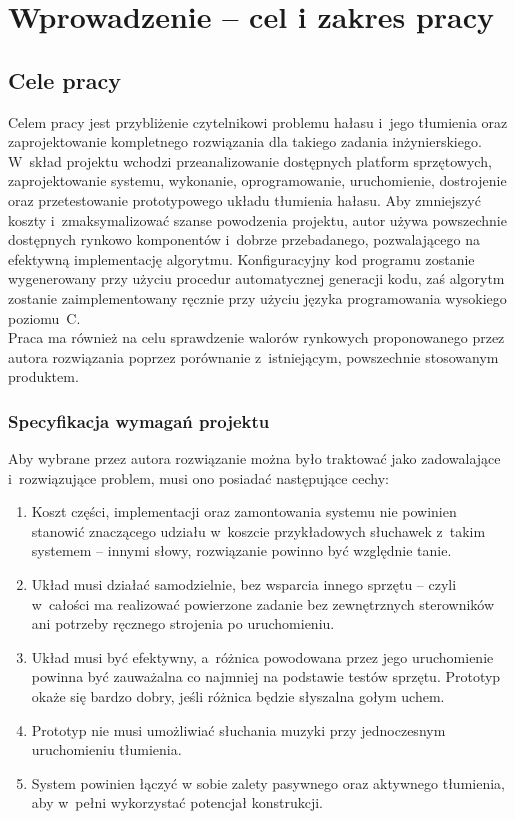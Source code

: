 \chapter{Wprowadzenie -- cel i zakres pracy}
\label{cha:intro}

\section{Cele pracy}
\label{sec:celePracy}
Celem pracy jest przybliżenie czytelnikowi problemu hałasu i~jego tłumienia oraz  zaprojektowanie kompletnego rozwiązania dla takiego zadania inżynierskiego. W~skład projektu wchodzi przeanalizowanie dostępnych platform sprzętowych, zaprojektowanie systemu, wykonanie, oprogramowanie, uruchomienie, dostrojenie oraz przetestowanie prototypowego układu tłumienia hałasu. Aby zmniejszyć koszty i~zmaksymalizować szanse powodzenia projektu, autor używa powszechnie dostępnych rynkowo komponentów i~dobrze przebadanego, pozwalającego na efektywną implementację algorytmu. Konfiguracyjny kod programu zostanie wygenerowany przy użyciu procedur automatycznej generacji kodu, zaś algorytm zostanie zaimplementowany ręcznie przy użyciu języka programowania wysokiego poziomu~C.\\
Praca ma również na celu sprawdzenie walorów rynkowych proponowanego przez autora rozwiązania poprzez porównanie z~istniejącym, powszechnie stosowanym produktem.
\subsection{Specyfikacja wymagań projektu}
Aby wybrane przez autora rozwiązanie można było traktować jako zadowalające i~rozwiązujące problem, musi ono posiadać następujące cechy:
\begin{enumerate}
	\item Koszt części, implementacji oraz zamontowania systemu nie powinien stanowić znaczącego udziału w~koszcie przykładowych słuchawek z~takim systemem -- innymi słowy, rozwiązanie powinno być względnie tanie.
	\item Układ musi działać samodzielnie, bez wsparcia innego sprzętu -- czyli w~całości ma realizować powierzone zadanie bez zewnętrznych sterowników ani potrzeby ręcznego strojenia po uruchomieniu.
	\item Układ musi być efektywny, a~różnica powodowana przez jego uruchomienie powinna być zauważalna co najmniej na podstawie testów sprzętu. Prototyp okaże się bardzo dobry, jeśli różnica będzie słyszalna gołym uchem.
	\item Prototyp nie musi umożliwiać słuchania muzyki przy jednoczesnym uruchomieniu tłumienia.
	\item System powinien łączyć w sobie zalety pasywnego oraz aktywnego tłumienia, aby w~pełni wykorzystać potencjał konstrukcji.
\end{enumerate}
